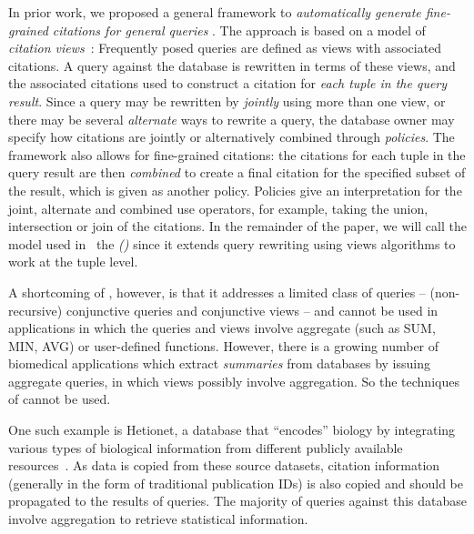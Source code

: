 In prior work, we proposed a general framework to {\em automatically generate fine-grained citations for general queries} \cite{alawini2017automating,wu2018data}.
The approach is based on a model of {\em citation views}~\cite{BunemanEtAl2016,davidson2017model,DBLP:conf/pods/DavidsonBDMS17}: Frequently posed queries  are defined as views with associated citations. A query against the database is rewritten in terms of these views, and the associated citations used to construct a citation for \textit{each tuple in the query result}. Since a query may be rewritten by \textit{jointly} using more than one view, or there may be several \textit{alternate} ways to rewrite a query, the database owner may specify how citations are jointly or alternatively combined through \textit{policies}.  The framework also allows for fine-grained citations: the citations for each tuple in the query result are then \textit{combined} to create a final citation for the specified subset of the result, which is given as another policy.  Policies give an interpretation for the joint, alternate and combined use operators, for example, taking the union, intersection or join of the citations.  In the remainder of the paper, we will call the model used in~\cite{wu2018data} the {\em {\rbafull} (\rba)} since it  extends query rewriting using views algorithms to work at the tuple level.

A shortcoming of {\rba}, however, is that it addresses a limited class of queries -- (non-recursive) conjunctive queries and conjunctive views -- and cannot be used in applications in which the queries and views involve aggregate (such as SUM, MIN, AVG) or user-defined functions.  However, there is a growing number of biomedical applications which extract \textit{summaries} from data\-bases by issuing aggregate queries, in which views possibly involve aggregation. So the techniques of \cite{wu2018data} cannot be used.


One such example is Hetionet, a database that ``encodes'' biology by integrating various types of biological information from different publicly available resources~\cite{himmelstein2017systematic}.
As data is copied from these source datasets, citation information (generally in the form of traditional publication IDs) is also copied and should be propagated to the results of queries.
The majority of queries against this database involve aggregation to retrieve statistical information.

